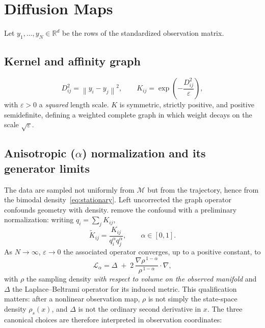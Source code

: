 \documentclass[11pt]{article}
\newcommand{\R}{\mathbb{R}}
\newcommand{\eps}{\varepsilon}
\newcommand{\Kt}{\widetilde{K}}
\newcommand{\norm}[1]{\left\lVert #1 \right\rVert}
\begin{document}
\section{Diffusion Maps}
\label{sec:dm}

Let $y_1,\dots,y_N\in\R^d$ be the rows of the standardized observation matrix.

\subsection{Kernel and affinity graph}

\begin{equation}
D^2_{ij} = \norm{y_i-y_j}^2 ,
\qquad
K_{ij} = \exp\!\left(-\frac{D^2_{ij}}{\eps}\right) ,
\label{eq:kernel}
\end{equation}
with $\eps>0$ a \emph{squared} length scale. $K$ is symmetric, strictly positive,
and positive semidefinite, defining a weighted complete graph in which weight
decays on the scale $\sqrt\eps$.

\subsection{Anisotropic ($\alpha$) normalization and its generator limits}
\label{sec:alpha}

The data are sampled not uniformly from $\mathcal{M}$ but from the trajectory,
hence from the bimodal density~\eqref{eq:stationary}. Left uncorrected the graph
operator confounds geometry with density. \citet{coifman2006diffusion} remove the
confound with a preliminary normalization: writing $q_i = \sum_j K_{ij}$,
\begin{equation}
\Kt_{ij} = \frac{K_{ij}}{q_i^\alpha q_j^\alpha} ,
\qquad \alpha\in[0,1] .
\label{eq:alpha}
\end{equation}
As $N\to\infty$, $\eps\to0$ the associated operator converges, up to a positive
constant, to
\begin{equation}
\mathcal{L}_\alpha = \Delta
\;+\; 2\,\frac{\nabla\rho^{\,1-\alpha}}{\rho^{\,1-\alpha}}\cdot\nabla ,
\label{eq:alphafamily}
\end{equation}
with $\rho$ the sampling density \emph{with respect to volume on the observed
manifold} and $\Delta$ the Laplace--Beltrami operator for its induced metric.
This qualification matters: after a nonlinear observation map, $\rho$ is not
simply the state-space density $\rho_s(x)$, and $\Delta$ is not the ordinary
second derivative in $x$. The three canonical choices are therefore interpreted
in observation coordinates:
\end{document}
